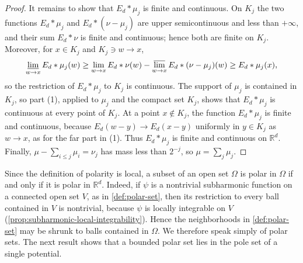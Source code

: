 \begin{proof}
It remains to show that $E_d*\mu_j$ is finite and continuous. On $K_j$ the two functions $E_d*\mu_j$ and $E_d*(\nu-\mu_j)$ are upper semicontinuous and less than $+\infty$, and their sum $E_d*\nu$ is finite and continuous; hence both are finite on $K_j$. Moreover, for $x\in K_j$ and $K_j\ni w\to x$,
\[
 \varliminf_{w\to x}E_d*\mu_j(w)\geq\lim_{w\to x}E_d*\nu(w)-\varlimsup_{w\to x}E_d*(\nu-\mu_j)(w)\geq E_d*\mu_j(x),
\]
so the restriction of $E_d*\mu_j$ to $K_j$ is continuous. The support of $\mu_j$ is contained in $K_j$, so part (1), applied to $\mu_j$ and the compact set $K_j$, shows that $E_d*\mu_j$ is continuous at every point of $K_j$. At a point $x\notin K_j$, the function $E_d*\mu_j$ is finite and continuous, because $E_d(w-y)\to E_d(x-y)$ uniformly in $y\in K_j$ as $w\to x$, as for the far part in (1). Thus $E_d*\mu_j$ is finite and continuous on $\mathbb R^d$. Finally, $\mu-\sum_{i\leq j}\mu_i=\nu_j$ has mass less than $2^{-j}$, so $\mu=\sum_j\mu_j$.
\end{proof}

Since the definition of polarity is local, a subset of an open set $\Omega$ is polar in $\Omega$ if and only if it is polar in $\mathbb R^d$. Indeed, if $\psi$ is a nontrivial subharmonic function on a connected open set $V$, as in \cref{def:polar-set}, then its restriction to every ball contained in $V$ is nontrivial, because $\psi$ is locally integrable on $V$ (\cref{prop:subharmonic-local-integrability}). Hence the neighborhoods in \cref{def:polar-set} may be shrunk to balls contained in $\Omega$. We therefore speak simply of polar sets. The next result shows that a bounded polar set lies in the pole set of a single potential.

